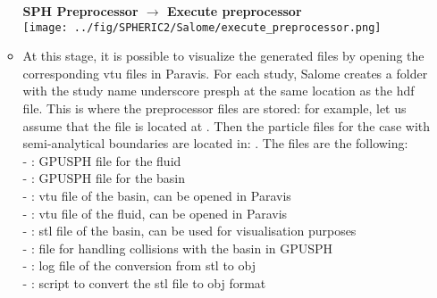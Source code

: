 \documentclass{../GPUSPHtemplate}
\begin{document}
\begin{enumerate}
\begin{itemize}
    \textbf{SPH Preprocessor $\to$ Execute preprocessor}\smallskip\\
    \texttt{[image: ../fig/SPHERIC2/Salome/execute\_preprocessor.png]}
  \item At this stage, it is possible to visualize the generated files by opening the corresponding vtu files in Paravis.
    For each study, Salome creates a folder with the study name underscore presph at the same location as the hdf file.
    This is where the preprocessor files are stored: for example, let us assume that the  file
    is located at . Then the particle files for the case
    with semi-analytical boundaries are located in:
    . The files are the following:\\
    - :  GPUSPH file for the fluid\\
    - : GPUSPH file for the basin\\
    - : vtu file of the basin, can be opened in Paravis\\
    - : vtu file of the fluid, can be opened in Paravis\\
    - : stl file of the basin, can be used for visualisation purposes\\
    - : file for handling collisions with the basin in GPUSPH\\
    - : log file of the conversion from stl to obj\\
    - : script to convert the stl file to obj format
  \end{itemize}
  

\end{enumerate}
\end{document}
